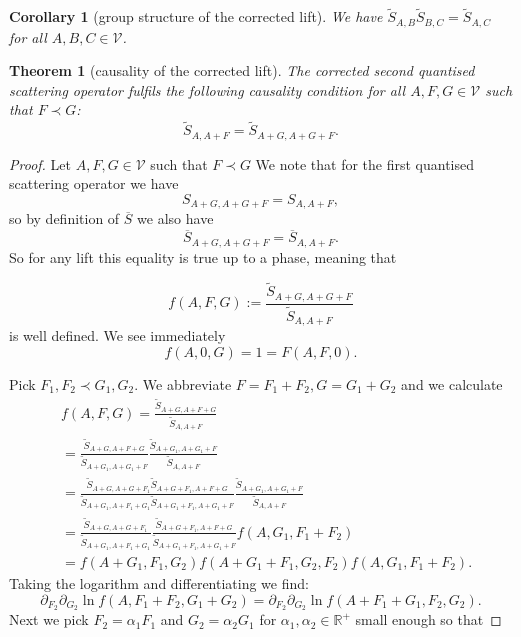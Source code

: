 \documentclass[b5paper,draft,openbib,12pt]{memoir}
\newtheorem{Thm}[Def]{Theorem}
\newtheorem{Corollary}[Def]{Corollary}
\begin{document}
\begin{Corollary}[group structure of the corrected lift]
We have \(\tilde{S}_{A,B} \tilde{S}_{B,C}=\tilde{S}_{A,C}\) for all \(A,B,C\in\mathcal{V}\).
\end{Corollary}

\begin{Thm}[causality of the corrected lift]
The corrected second quantised scattering operator fulfils the following causality condition for all \(A,F,G\in \mathcal{V}\) such that \(F\prec G\):
\begin{equation}
\tilde{S}_{A,A+F}=\tilde{S}_{A+G,A+G+F}.
\end{equation}
\end{Thm}
\begin{proof}
Let \(A,F,G\in\mathcal{V}\) such that \(F\prec G\) We note that for the first quantised scattering operator we have
\begin{equation}
S_{A+G,A+G+F}=S_{A,A+F},
\end{equation}
so by definition of \(\overline{S}\) we also have
\begin{equation}\label{s bar causal}
\overline{S}_{A+G,A+G+F}=\overline{S}_{A,A+F}.
\end{equation}
So for any lift this equality is true up to a phase, meaning that 

\begin{equation}\label{f causal}
f(A,F,G):=\frac{\tilde{S}_{A+G,A+G+F}}{\tilde{S}_{A,A+F}}
\end{equation}
is well defined. We see immediately
\begin{equation}\label{vanish at axis}
f(A,0,G)=1=F(A,F,0).
\end{equation}

Pick \(F_1,F_2\prec G_1,G_2\). We abbreviate \(F=F_1+F_2, G=G_1+G_2\) and we calculate
\begin{align}
&f(A,F,G)=\frac{\tilde{S}_{A+G,A+F+G}}{\tilde{S}_{A,A+F}}\\
&=\frac{\tilde{S}_{A+G,A+F+G}}{\tilde{S}_{A+G_1,A+G_1+F}}\frac{\tilde{S}_{A+G_1,A+G_1+F}}{\tilde{S}_{A,A+F}}\\
&=\frac{\tilde{S}_{A+G,A+G+F_1} \tilde{S}_{A+G+F_1,A+F+G}}{\tilde{S}_{ A+G_1,A+F_1+G_1} \tilde{S}_{ A+G_1+F_1,A+G_1+F}}  \frac{\tilde{S}_{A+G_1,A+G_1+F}}{\tilde{S}_{A,A+F}}\\
&=\frac{\tilde{S}_{A+G,A+G+F_1}}{\tilde{S}_{A+G_1,A+F_1+G_1}} \frac{\tilde{S}_{A+G+F_1,A+F+G}}{\tilde{S}_{A+G_1+F_1,A+G_1+F}}   f(A,G_1,F_1+F_2)\\
&=f(A+G_1,F_1,G_2)f(A+G_1+F_1,G_2,F_2)f(A,G_1,F_1+F_2).
\end{align}
Taking the logarithm and differentiating we find:
\begin{equation}\label{shift to small G,F}
\partial_{F_2}\partial_{G_2}\ln f(A,F_1+F_2,G_1+G_2)=\partial_{F_2}\partial_{G_2}\ln f(A+F_1+G_1,F_2,G_2).
\end{equation}
Next we pick \(F_2=\alpha_1 F_1\) and \(G_2=\alpha_2 G_1\) for \(\alpha_1,\alpha_2\in\mathbb{R}^+\) small enough so that


\end{proof}
\end{document}
